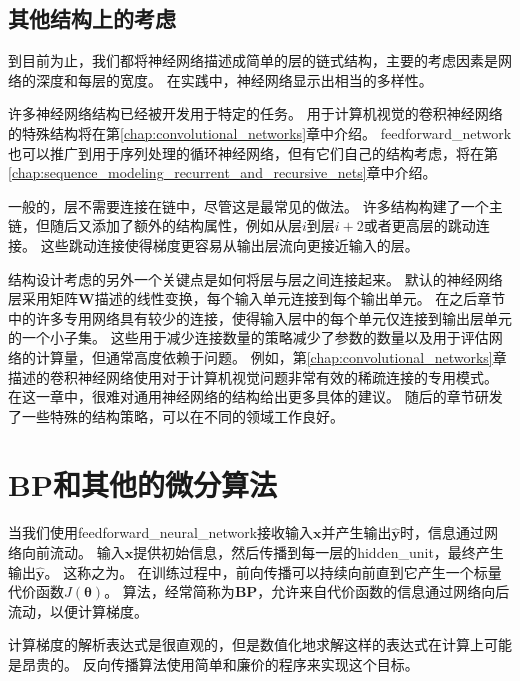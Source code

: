 \subsection{其他结构上的考虑}
\label{sec:other_architectural_considerations}

到目前为止，我们都将神经网络描述成简单的层的链式结构，主要的考虑因素是网络的深度和每层的宽度。
在实践中，神经网络显示出相当的多样性。

许多神经网络结构已经被开发用于特定的任务。
用于计算机视觉的卷积神经网络的特殊结构将在第\ref{chap:convolutional_networks}章中介绍。
\gls{feedforward_network}也可以推广到用于序列处理的循环神经网络，但有它们自己的结构考虑，将在第\ref{chap:sequence_modeling_recurrent_and_recursive_nets}章中介绍。


一般的，层不需要连接在链中，尽管这是最常见的做法。
许多结构构建了一个主链，但随后又添加了额外的结构属性，例如从层$i$到层$i+2$或者更高层的跳动连接。
这些跳动连接使得梯度更容易从输出层流向更接近输入的层。

结构设计考虑的另外一个关键点是如何将层与层之间连接起来。
默认的神经网络层采用矩阵$\bm{W}$描述的线性变换，每个输入单元连接到每个输出单元。
在之后章节中的许多专用网络具有较少的连接，使得输入层中的每个单元仅连接到输出层单元的一个小子集。
这些用于减少连接数量的策略减少了参数的数量以及用于评估网络的计算量，但通常高度依赖于问题。
例如，第\ref{chap:convolutional_networks}章描述的卷积神经网络使用对于计算机视觉问题非常有效的稀疏连接的专用模式。
在这一章中，很难对通用神经网络的结构给出更多具体的建议。
随后的章节研发了一些特殊的结构策略，可以在不同的领域工作良好。


\section{\gls{BP}和其他的微分算法}
\label{sec:back_propagation_and_other_differentiation_algorithms}

当我们使用\gls{feedforward_neural_network}接收输入$\bm{x}$并产生输出$\hat{\bm{y}}$时，信息通过网络向前流动。
输入$\bm{x}$提供初始信息，然后传播到每一层的\gls{hidden_unit}，最终产生输出$\hat{\bm{y}}$。
这称之为。
在训练过程中，前向传播可以持续向前直到它产生一个标量代价函数$J(\bm{\theta})$。
算法\citep{RHW}，经常简称为\textbf{\glsdesc{BP}}，允许来自代价函数的信息通过网络向后流动，以便计算梯度。


计算梯度的解析表达式是很直观的，但是数值化地求解这样的表达式在计算上可能是昂贵的。
 反向传播算法使用简单和廉价的程序来实现这个目标。


